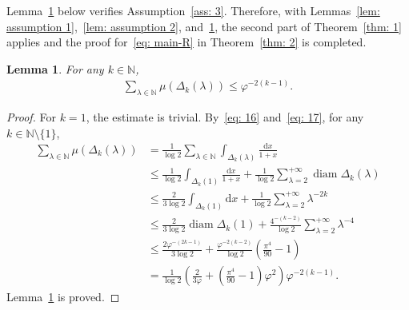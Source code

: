 \documentclass[12pt,reqno]{amsart}
\theoremstyle{definition}
\theoremstyle{plain}
\newtheorem{lemma}{Lemma}
\begin{document}
Lemma~\ref{lem: assumption 3} below verifies Assumption~\ref{ass: 3}. Therefore, with Lemmas~\ref{lem: assumption 1},~\ref{lem: assumption 2}, and~\ref{lem: assumption 3}, the second part of Theorem~\ref{thm: 1} applies and the proof for~\eqref{eq: main-R} in Theorem~\ref{thm: 2} is completed.
\begin{lemma}\label{lem: assumption 3}
For any $k\in\mathbb{N}$,
\begin{align*}
    \sum_{\lambda\in\mathbb{N}}\mu{(\Delta_k{\left({\lambda}\right)})}\leq\varphi^{-2(k-1)}.
\end{align*}
\end{lemma}
\begin{proof}
For $k=1$, the estimate is trivial. By~\eqref{eq: 16} and~\eqref{eq: 17}, for any $k\in\mathbb{N}\setminus\{1\}$,
\begin{align*}
    \sum_{\lambda\in\mathbb{N}}\mu{(\Delta_k{\left({\lambda}\right)})}
    &= \frac{1}{\log{2}}\sum_{\lambda\in\mathbb{N}}\int_{\Delta_k{(\lambda)}}\frac{\mathrm{d}x}{1+x} \\
    &\leq \frac{1}{\log 2}\int_{\Delta_k{(1)}}\frac{\mathrm{d}x}{1+x}+\frac{1}{\log 2}\sum_{\lambda=2}^{+\infty}\operatorname{diam}{\Delta_k{(\lambda)}} \\
    &\leq \frac{2}{3\log 2}\int_{\Delta_k{(1)}}\mathrm{d}x+\frac{1}{\log 2}\sum_{\lambda=2}^{+\infty} \lambda^{-2k}\\
    &\leq \frac{2}{3\log 2}\operatorname{diam}{\Delta_k{(1)}}+\frac{4^{-(k-2)}}{\log 2}\sum_{\lambda=2}^{+\infty} \lambda^{-4}\\
    &\leq \frac{2\varphi^{-(2k-1)}}{3\log 2} +\frac{\varphi^{-2(k-2)}}{\log 2}\left(\frac{\pi^4}{90}-1\right) \\
    &= \frac{1}{\log{2}}\left(\frac{2}{3\varphi}+\left(\frac{\pi^4}{90}-1\right)\varphi^{2}\right)\varphi^{-2(k-1)}.
\end{align*}
Lemma~\ref{lem: assumption 3} is proved.
\end{proof}

 

\end{document}
